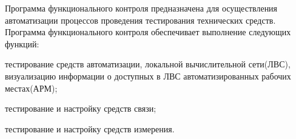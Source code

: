 \begin{minipage}
Программа функционального контроля предназначена для осуществления автоматизации процессов проведения тестирования технических средств.
Программа функционального контроля обеспечивает выполнение следующих функций:
\begin{legal}
    \item тестирование средств автоматизации, локальной вычислительной сети(ЛВС), визуализацию информации о доступных в ЛВС автоматизированных рабочих местах(АРМ);
    \item тестирование и настройку средств связи;
    \item тестирование и настройку средств измерения.
\end{legal}
\end{minipage}

